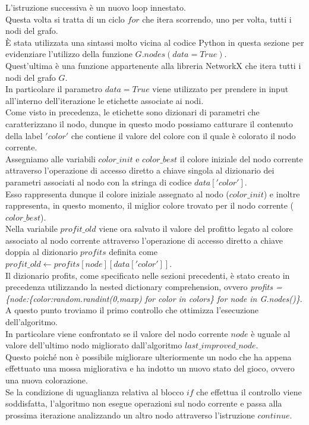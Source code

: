 L'istruzione successiva è un nuovo loop innestato.\\ Questa volta si tratta di un ciclo $for$ che itera scorrendo, uno per volta, tutti i nodi del grafo.\\
È stata utilizzata una sintassi molto vicina al codice Python in questa sezione per evidenziare l'utilizzo della funzione $G.nodes(data=True)$.\\
Quest'ultima è una funzione appartenente alla libreria NetworkX che itera tutti i nodi del grafo $G$.\\
In particolare il parametro $data=True$ viene utilizzato per prendere in input all'interno dell'iterazione le etichette associate ai nodi.\\
Come visto in precedenza, le etichette sono dizionari di parametri che caratterizzano il nodo, dunque in questo modo possiamo catturare il contenuto della label $'color'$ che contiene il valore del colore con il quale è colorato il nodo corrente.\\

Assegniamo alle variabili $color\_init$ e $color\_best$ il colore iniziale del nodo corrente attraverso l'operazione di accesso diretto a chiave singola al dizionario dei parametri associati al nodo con la stringa di codice $data['color']$.\\
Esso rappresenta dunque il colore iniziale assegnato al nodo ($color\_init$) e inoltre rappresenta, in questo momento, il miglior colore trovato per il nodo corrente ($color\_best$).\\

Nella variabile $profit\_old$ viene ora salvato il valore del profitto legato al colore associato al nodo corrente attraverso l'operazione di accesso diretto a chiave doppia al dizionario $profits$ definita come $profit\_old\gets profits[node][data['color']]$.\\
Il dizionario profits, come specificato nelle sezioni precedenti, è stato creato in precedenza utilizzando la nested dictionary comprehension, ovvero \textit{profits = \{node:\{color:random.randint(0,maxp) for color in colors\} for node in G.nodes()\}}.\\

A questo punto troviamo il primo controllo che ottimizza l'esecuzione dell'algoritmo.\\
In particolare viene confrontato se il valore del nodo corrente $node$ è uguale al valore dell'ultimo nodo migliorato dall'algoritmo $last\_improved\_node$.\\
Questo poiché non è possibile migliorare ulteriormente un nodo che ha appena effettuato una mossa migliorativa e ha indotto un nuovo stato del gioco, ovvero una nuova colorazione.\\
Se la condizione di uguaglianza relativa al blocco $if$ che effettua il controllo viene soddisfatta, l'algoritmo non esegue operazioni sul nodo corrente e passa alla prossima iterazione analizzando un altro nodo attraverso l'istruzione $continue$.\\


